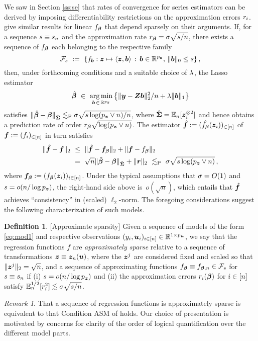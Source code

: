 \documentclass{uwstat572}
\newcommand{\be}{\begin{equation}}
\newcommand{\ee}{\end{equation}}
\newcommand{\benn}{\begin{equation*}}
\newcommand{\eenn}{\end{equation*}}
\theoremstyle{definition}
\newtheorem{defi}[thm]{Definition}
\theoremstyle{remark}
\newtheorem{rek}[thm]{Remark}
\newcommand{\R}{\ensuremath{\mathbb{R}}}
\newcommand{\Prb}{\mathrm{P}}
\newcommand{\Ex}{\mathbb{E}}
\newcommand{\Exn}{\Ex_n}
\DeclareMathOperator*{\argmin}{arg\,min}
\newcommand{\bs}[1]{\boldsymbol{#1}}
\numberwithin{equation}{section}
\begin{document}
We saw in Section \ref{ss:se} that rates of convergence for series estimators can be derived by imposing differentiability restrictions on the approximation errors $\remi$. \cite{BCH11} give similar results for linear $\fb$ that depend sparsely on their arguments. If, for a sequence $\sb \equiv \sb_n$ and the approximation rate $\rb = \sd\sqrt{\sb/n}$, there exists a sequence of $\fb$ each belonging to the respective family
\benn%
	\fams \ := \ \{ f_{\bs{b}}: \z \mapsto \langle \z, \bs{b}\rangle \,:\, \bs{b} \in \R^{\pz},\, \|\bs{b}\|_0 \leq \sb \} \,,
\eenn
then, under forthcoming conditions and a suitable choice of $\tune$, the Lasso estimator
\be\label{def:lasso}
	\regbh \ \in \ \argmin_{\bs{b}\,\in\,\R^{\pz}} \big\{ \|\y - \Z\bs{b}\|_2^2/n + \tune\|\bs{b}\|_1 \big\}
\ee
satisfies $\|\regbh - \regb\|_{\gramhat} \lesssim_\Prb \sd\sqrt{s\log(\pz\vee n)/n}$, where $\gramhat = \Exn[\z_i^{\kpt}]$ and hence obtains a prediction rate of order $\rb\sqrt{\log(\pz\vee n)}$. The estimator $\fhat := (\fbhat(\z_i))_{\inn}$ of $\f := (f_i)_{\inn}$ in turn satisfies
\begin{align}
	\| \fhat -\f \|_2 \ & \leq \  \|\fhat - \ffb\|_2 + \| \f - \fb \|_2 \nonumber\\
	& = \ \sqrt{n}\|\regbh - \regb\|_{\gramhat} + \|\rem\|_2 \ \lesssim_\Prb \ \sd\sqrt{\sb\log(\pz\vee n)} \,,
\end{align}
where $\ffb := (\fb(\z_i))_{i\inn}$. Under the typical assumptions that $\sd = O(1)$ and $\sb = o(n/\log\pz)$, the right-hand side above is~$o(\sqrt{n})$, which entails that $\fhat$ achieves ``consistency'' in (scaled) $\ell_2$-norm. The foregoing considerations suggest the following characterization of such models.

\begin{defi}\label{def:as}[Approximate sparsity] Given a sequence of models of the form \eqref{eq:mod1} and respective observations $(y_i, \u_i)_{i\inn} \in \R^{1\times\pu}$, we say that the regression functions $f$ are \emph{approximately sparse} relative to a sequence of transformations $\z \equiv \z_n(\u)$, where the $\z^j$ are considered fixed and scaled so that $\|\z^j\|_2 = \sqrt{n}$, and a sequence of approximating functions $\fb \equiv \fbn \in \fams$ for $\sb \equiv \sb_n$ if (i) $\sb = o(n/\log\pz)$ and (ii) the approximation errors $\remi(\regb)$ for $i\inn$ satisfy $\Exn^{1/2}[\remi^2] \lesssim \sd\sqrt{\sb/n}$.
\end{defi}

\begin{rek} That a sequence of regression functions is approximately sparse is equivalent to that Condition ASM of \cite{BCH11} holds. Our choice of presentation is motivated by concerns for clarity of the order of logical quantification over the different model parts. 
\end{rek}
\end{document}
